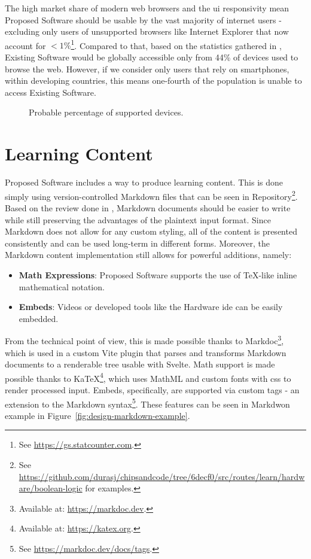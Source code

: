 The high market share of modern web browsers and the \gls{ui} responsivity mean Proposed Software should be usable by the vast majority of internet users - excluding only users of unsupported browsers like Internet Explorer that now account for $<1\%$\footnote{See \url{https://gs.statcounter.com}.}.
Compared to that, based on the statistics gathered in , Existing Software would be globally accessible only from 44\% of devices used to browse the web.
However, if we consider only users that rely on smartphones, within developing countries, this means one-fourth of the population is unable to access Existing Software.

\begin{figure}[H]
    \centering
    
    \caption{Probable percentage of supported devices.}
    \label{fig:design-device-support}
\end{figure}

\section{Learning Content}

Proposed Software includes a way to produce learning content.
This is done simply using version-controlled Markdown files that can be seen in Repository\footnote{See \url{https://github.com/durasj/chipsandcode/tree/6decf0/src/routes/learn/hardware/boolean-logic} for examples.}.
Based on the review done in , Markdown documents should be easier to write while still preserving the advantages of the plaintext input format.
Since Markdown does not allow for any custom styling, all of the content is presented consistently and can be used long-term in different forms.
Moreover, the Markdown content implementation still allows for powerful additions, namely:

\begin{itemize}
    \item \textbf{Math Expressions}: Proposed Software supports the use of TeX-like inline mathematical notation.
    \item \textbf{Embeds}: Videos or developed tools like the Hardware \gls{ide} can be easily embedded.
\end{itemize}

From the technical point of view, this is made possible thanks to Markdoc\footnote{Available at: \url{https://markdoc.dev}.}, which is used in a custom Vite plugin that parses and transforms Markdown documents to a renderable tree usable with Svelte.
Math support is made possible thanks to KaTeX\footnote{Available at: \url{https://katex.org}.}, which uses MathML and custom fonts with \gls{css} to render processed input.
Embeds, specifically, are supported via custom tags - an extension to the Markdown syntax\footnote{See \url{https://markdoc.dev/docs/tags}.}.
These features can be seen in Markdwon example in Figure~\ref{fig:design-markdown-example}.

